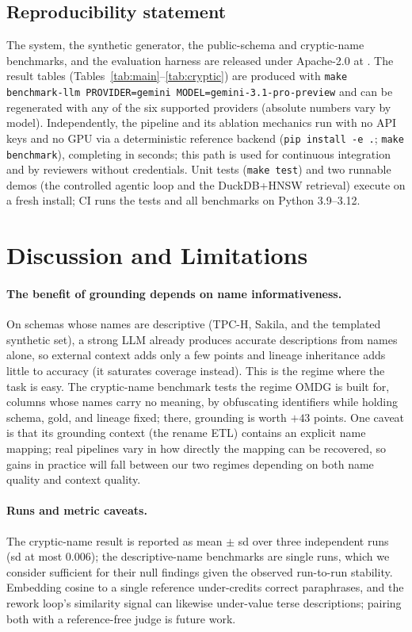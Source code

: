 \subsection{Reproducibility statement}
The system, the synthetic generator, the public-schema and cryptic-name benchmarks, and the
evaluation harness are released under Apache-2.0 at \REPO. The result tables
(Tables~\ref{tab:main}--\ref{tab:cryptic}) are produced with
\texttt{make benchmark-llm PROVIDER=gemini MODEL=gemini-3.1-pro-preview} and can be
regenerated with any of the six supported providers (absolute numbers vary by model).
Independently, the pipeline and its ablation mechanics run with no API keys and no GPU via
a deterministic reference backend (\texttt{pip install -e .}; \texttt{make benchmark}),
completing in seconds; this path is used for continuous integration and by reviewers
without credentials. Unit tests (\texttt{make test}) and two runnable demos (the controlled
agentic loop and the DuckDB+HNSW retrieval) execute on a fresh install; CI runs the tests
and all benchmarks on Python 3.9--3.12.

\section{Discussion and Limitations}\label{sec:limitations}
\paragraph{The benefit of grounding depends on name informativeness.} On schemas whose
names are descriptive (TPC-H, Sakila, and the templated synthetic set), a strong LLM
already produces accurate descriptions from names alone, so external context adds only a
few points and lineage inheritance adds little to accuracy (it saturates coverage instead).
This is the regime where the task is easy. The cryptic-name benchmark tests the regime OMDG
is built for, columns whose names carry no meaning, by obfuscating identifiers while
holding schema, gold, and lineage fixed; there, grounding is worth $+43$ points. One caveat
is that its grounding context (the rename ETL) contains an explicit name mapping; real
pipelines vary in how directly the mapping can be recovered, so gains in practice will fall
between our two regimes depending on both name quality and context quality.
\paragraph{Runs and metric caveats.} The cryptic-name result is reported as mean $\pm$ sd
over three independent runs (sd at most 0.006); the descriptive-name benchmarks are single
runs, which we consider sufficient for their null findings given the observed run-to-run
stability. Embedding cosine to a single reference under-credits correct paraphrases, and
the rework loop's similarity signal can likewise under-value terse descriptions; pairing
both with a reference-free judge is future work.
